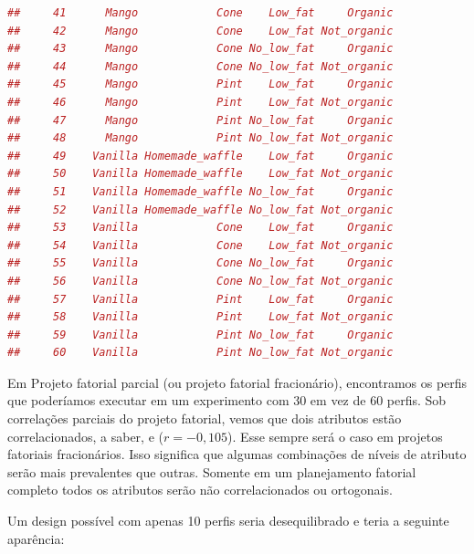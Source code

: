 \documentclass{article}
\begin{document}
\begin{lstlisting}[language=R]
##     41      Mango            Cone    Low_fat     Organic
##     42      Mango            Cone    Low_fat Not_organic
##     43      Mango            Cone No_low_fat     Organic
##     44      Mango            Cone No_low_fat Not_organic
##     45      Mango            Pint    Low_fat     Organic
##     46      Mango            Pint    Low_fat Not_organic
##     47      Mango            Pint No_low_fat     Organic
##     48      Mango            Pint No_low_fat Not_organic
##     49    Vanilla Homemade_waffle    Low_fat     Organic
##     50    Vanilla Homemade_waffle    Low_fat Not_organic
##     51    Vanilla Homemade_waffle No_low_fat     Organic
##     52    Vanilla Homemade_waffle No_low_fat Not_organic
##     53    Vanilla            Cone    Low_fat     Organic
##     54    Vanilla            Cone    Low_fat Not_organic
##     55    Vanilla            Cone No_low_fat     Organic
##     56    Vanilla            Cone No_low_fat Not_organic
##     57    Vanilla            Pint    Low_fat     Organic
##     58    Vanilla            Pint    Low_fat Not_organic
##     59    Vanilla            Pint No_low_fat     Organic
##     60    Vanilla            Pint No_low_fat Not_organic
\end{lstlisting}


Em Projeto fatorial parcial (ou projeto fatorial fracionário), encontramos os perfis que poderíamos executar em um experimento com 30 em vez de 60 perfis. Sob correlações parciais do projeto fatorial, vemos que dois atributos estão correlacionados, a saber,  e  ($r = -0,105$). Esse sempre será o caso em projetos fatoriais fracionários. Isso significa que algumas combinações de níveis de atributo serão mais prevalentes que outras. Somente em um planejamento fatorial completo todos os atributos serão não correlacionados ou ortogonais.

Um design possível com apenas 10 perfis seria desequilibrado e teria a seguinte aparência:
\end{document}
